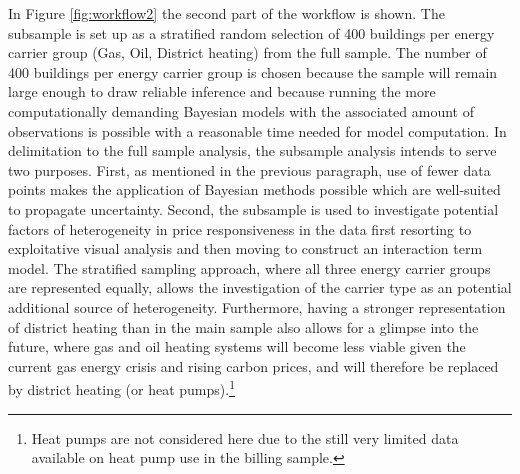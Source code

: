 \documentclass[12pt,twoside]{reedthesis}
\begin{document}
In Figure \ref{fig:workflow2} the second part of the workflow is shown. The subsample is set up as a stratified random selection of 400 buildings per energy carrier group (Gas, Oil, District heating) from the full sample. The number of 400 buildings per energy carrier group is chosen because the sample will remain large enough to draw reliable inference and because running the more computationally demanding Bayesian models with the associated amount of observations is possible with a reasonable time needed for model computation. In delimitation to the full sample analysis, the subsample analysis intends to serve two purposes. First, as mentioned in the previous paragraph, use of fewer data points makes the application of Bayesian methods possible which are well-suited to propagate uncertainty. Second, the subsample is used to investigate potential factors of heterogeneity in price responsiveness in the data first resorting to exploitative visual analysis and then moving to construct an interaction term model. The stratified sampling approach, where all three energy carrier groups are represented equally, allows the investigation of the carrier type as an potential additional source of heterogeneity. Furthermore, having a stronger representation of district heating than in the main sample also allows for a glimpse into the future, where gas and oil heating systems will become less viable given the current gas energy crisis and rising carbon prices, and will therefore be replaced by district heating (or heat pumps).\footnote{Heat pumps are not considered here due to the still very limited data available on heat pump use in the billing sample.}
\end{document}

